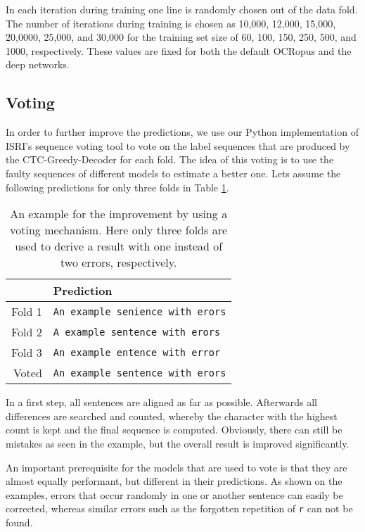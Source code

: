 \documentclass{jlcl}
\begin{document}
In each iteration during training one line is randomly chosen out of the data fold.
The number of iterations during training is chosen as 10,000, 12,000, 15,000, 20,0000, 25,000, and 30,000 for the training set size of 60, 100, 150, 250, 500, and 1000, respectively.
These values are fixed for both the default OCRopus and the deep networks.


\subsection{Voting}
\label{sec:voting}
In order to further improve the predictions, we use our Python implementation of ISRI's sequence voting tool to vote on the label sequences that are produced by the CTC-Greedy-Decoder for each fold.
The idea of this voting is to use the faulty sequences of different models to estimate a better one.
Lets assume the following predictions for only three folds in Table \ref{tab:example_voting}.
\begin{table}[t]
    \centering
    \caption{An example for the improvement by using a voting mechanism. Here only three folds are used to derive a result with one instead of two errors, respectively.}
    \label{tab:example_voting}
    \begin{tabular}{rl}
        \hline
               & \textbf{Prediction} \\
        \hline
        Fold 1 & \texttt{An example senience with erors} \\
        Fold 2 & \texttt{A example sentence with erors} \\
        Fold 3 & \texttt{An example entence with error} \\
        \hline
        Voted & \texttt{An example sentence with erors} \\
        \hline
    \end{tabular}
\end{table}
In a first step, all sentences are aligned as far as possible.
Afterwards all differences are searched and counted, whereby the character with the highest count is kept and the final sequence is computed.
Obviously, there can still be mistakes as seen in the example, but the overall result is improved significantly.

An important prerequisite for the models that are used to vote is that they are almost equally performant, but different in their predictions.
As shown on the examples, errors that occur randomly in one or another sentence can easily be corrected, whereas similar errors such as the forgotten repetition of \texttt{r} can not be found.
\end{document}
